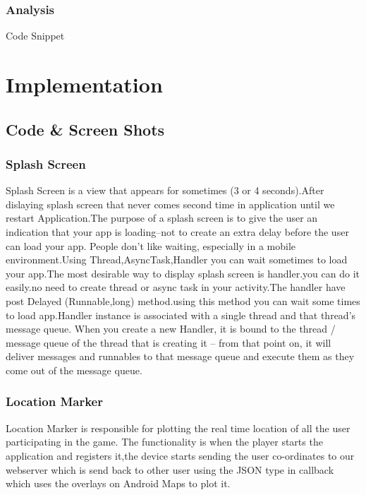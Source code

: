 \documentclass[12pt,a4paper,times]{report}
\begin{document}
\subsection{Analysis}
Code Snippet




\chapter{Implementation}


\section{\ignorespacesSource Code & Screen Shots}

\subsection{Splash Screen}

Splash Screen is a view that appears for sometimes (3 or 4 seconds).After dislaying splash screen that never comes second time in application until we restart Application.The purpose of a splash screen is to give the user an indication that your app is loading–not to create an extra delay before the user can load your app. People don’t like waiting, especially in a mobile environment.Using Thread,AsyncTask,Handler you can wait sometimes to load your app.The most desirable way to display splash screen is handler.you can do it easily.no need to create thread or async task in your activity.The handler have post Delayed (Runnable,long)  method.using this method you can wait some times to load app.Handler instance is associated with a single thread and that thread's message queue. When you create a new Handler, it is bound to the thread / message queue of the thread that is creating it -- from that point on, it will deliver messages and runnables to that message queue and execute them as they come out of the message queue.







%


\subsection{Location Marker}


Location Marker is responsible  for plotting the real time location of all the user participating in the game. The functionality is when the player starts the application and registers it,the device starts sending the user co-ordinates to our webserver which is send back to other user using the JSON type in callback which uses the overlays on Android Maps to plot it.
\end{document}
